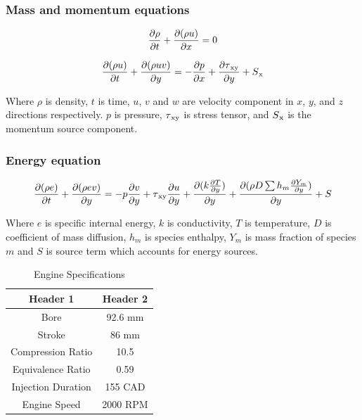 \documentclass[conference]{IEEEtran}
\begin{document}
\subsubsection{Mass and momentum equations}

    \begin{gather*}
        \pdv{\rho}{t} + \pdv{(\rho u)}{ x} = 0
    \end{gather*}

    \begin{gather*}
        \pdv{(\rho u)}{t} + \pdv{(\rho uv)}{y} = - \pdv{p}{x} + \pdv{\tau\textsubscript{xy}}{y} + S\textsubscript{x}
    \end{gather*}

Where $\rho$ is density, $t$ is time, $u$, $v$ and $w$ are velocity component in $x$, $y$, and $z$ directions respectively. 
$p$ is pressure, $\tau\textsubscript{xy}$ is stress tensor, and $S\textsubscript{x}$ is the momentum source component.\\

\subsubsection{Energy equation}

    \begin{gather*}
        \pdv{(\rho e)}{t} + \pdv{(\rho ev)}{y} = -p \pdv{v}{y} + \tau \textsubscript{xy} \pdv{u}{y} + \pdv{(k \pdv{T}{y})}{y} + \pdv{(\rho D \sum h_m \pdv{Y_m}{y})}{y} + S
    \end{gather*}

Where $e$ is specific internal energy, $k$ is conductivity, $T$ is temperature, $D$ is coefficient of mass diffusion, $h_m$ is species enthalpy, $Y_m$ is mass fraction of species $m$ and $S$ is source term which accounts for energy sources.



\begin{table}[!ht]
    \centering
    \caption{Engine Specifications}
    \label{your_label_here}
    \begin{tabular}{|c|c|}
    \hline
    Header 1 & Header 2 \\
    \hline
    Bore & 92.6 mm \\
    Stroke & 86 mm \\
    Compression Ratio & 10.5 \\
    Equivalence Ratio & 0.59 \\
    Injection Duration & 155 CAD \\
    Engine Speed & 2000 RPM \\
    \hline
    \end{tabular}
    \end{table}
\end{document}
